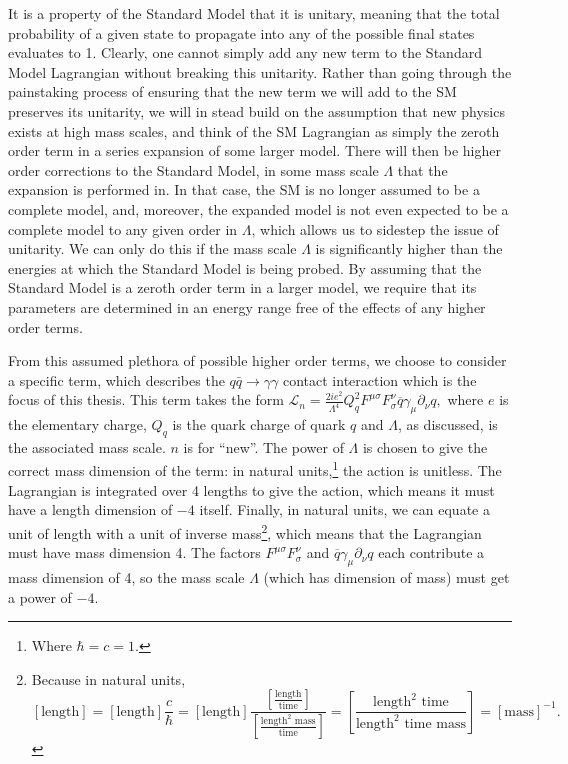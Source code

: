 It is a property of the Standard Model
that it is unitary, meaning that the total probability of a given state to propagate into any of the possible final states evaluates to 1. Clearly, one cannot simply add any new term to the Standard Model Lagrangian without breaking this unitarity. Rather than going through the painstaking process of ensuring that the new term we will add to the SM preserves its unitarity, we will in stead build on the assumption that new physics exists at high mass scales, and think of the SM Lagrangian as simply the zeroth order term in a series expansion of some larger model. There will then be higher order corrections to the Standard Model, in some mass scale $\Lambda$ that the expansion is performed in. 
In that case, the SM is no longer assumed to be a complete model, and, moreover, the expanded model is not even expected to be a complete model to any given order in $\Lambda$, which allows us to sidestep the issue of unitarity.
We can only do this if the mass scale $\Lambda$ is significantly higher than the energies at which the Standard Model is being probed. By assuming that the Standard Model is a zeroth order term in a larger model, we require that its parameters are determined in an energy range free of the effects of any higher order terms.

From this assumed plethora of possible higher order terms, we choose to consider a specific term, which describes the $q\bar q\rightarrow\gamma\gamma$ contact interaction which is the focus of this thesis. This term takes the form \cite{rizzo}
\(\mathcal L_n = \frac{2ie^2}{\Lambda^4}Q_q^2F^{\mu\sigma}F^\nu_\sigma\overline{q}\gamma_\mu\partial_\nu q,\label{rizzo}\)
where $e$ is the elementary charge, $Q_q$ is the quark charge of quark $q$ and $\Lambda$, as discussed, is the associated mass scale. $n$ is for ``new''. The power of $\Lambda$ is chosen to give the correct mass dimension of the term: in natural units,\footnote{Where $\hbar = c = 1$.} the action is unitless. The Lagrangian is integrated over 4 lengths to give the action, which means it must have a length dimension of $-4$ itself. Finally, in natural units, we can equate a unit of length with a unit of inverse mass\footnote{Because in natural units, \[[\text{length}]=[\text{length}]\frac{c}{\hbar}=[\text{length}]\frac{\left[\frac{\text{length}}{\text{time}}\right]}{\left[\frac{\text{length}^2\text{ mass}}{\text{time}}\right]}=\left[\frac{\text{length}^2\text{ time}}{\text{length}^2\text{ time}\text{ mass}}\right]=[\text{mass}]^{-1}. \]}, which means that the Lagrangian must have mass dimension 4. The factors $F^{\mu\sigma}F^\nu_\sigma$ and $\overline{q}\gamma_\mu\partial_\nu q$ each contribute a mass dimension of 4, so the mass scale $\Lambda$ (which has dimension of mass) must get a power of $-4$.

